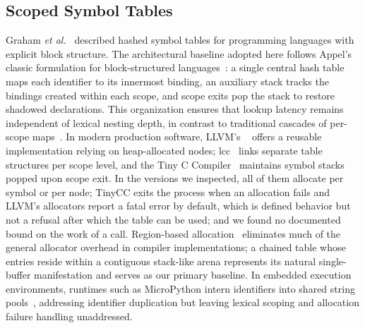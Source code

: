 \subsection{Scoped Symbol Tables}
Graham \emph{et al.}~\cite{graham1979} described hashed symbol tables for programming languages with explicit block structure. The architectural baseline adopted here follows Appel's classic formulation for block-structured languages~\cite{appel1998}: a single central hash table maps each identifier to its innermost binding, an auxiliary stack tracks the bindings created within each scope, and scope exits pop the stack to restore shadowed declarations. This organization ensures that lookup latency remains independent of lexical nesting depth, in contrast to traditional cascades of per-scope maps~\cite{aho2006}. In modern production software, LLVM's ~\cite{llvmsht} offers a reusable implementation relying on heap-allocated nodes; lcc~\cite{fraserhanson1995} links separate table structures per scope level, and the Tiny C Compiler~\cite{tcc} maintains symbol stacks popped upon scope exit. In the versions we inspected, all of them allocate per symbol or per node; TinyCC exits the process when an allocation fails and LLVM's allocators report a fatal error by default, which is defined behavior but not a refusal after which the table can be used; and we found no documented bound on the work of a call. Region-based allocation~\cite{hanson1990} eliminates much of the general allocator overhead in compiler implementations; a chained table whose entries reside within a contiguous stack-like arena represents its natural single-buffer manifestation and serves as our primary baseline. In embedded execution environments, runtimes such as MicroPython intern identifiers into shared string pools~\cite{micropython}, addressing identifier duplication but leaving lexical scoping and allocation failure handling unaddressed.

